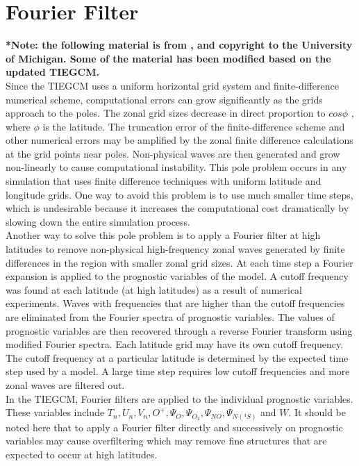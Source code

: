 \section{Fourier Filter}\label{cap:fourier}
%
\textbf{*Note: the following material is from \cite{wang1998}, 
and copyright to the University of Michigan. Some of 
the material has been modified based on the updated TIEGCM.} \\
%
Since the TIEGCM uses a uniform horizontal grid system 
and finite-difference numerical scheme, computational 
errors can grow significantly as the grids approach to 
the poles. The zonal grid sizes decrease in direct 
proportion to $cos \phi$ , where $\phi$ is the latitude. The truncation 
error of the finite-difference scheme and other numerical 
errors may be amplified by the zonal finite difference 
calculations at the grid points near poles. Non-physical 
waves are then generated and grow non-linearly to cause 
computational instability. This pole problem occurs in any 
simulation that uses finite difference techniques with uniform 
latitude and longitude grids. One way to avoid this problem is 
to use much smaller time steps, which is undesirable because it 
increases the computational cost dramatically by slowing down the 
entire simulation process. \\
%
Another way to solve this pole problem is to apply a Fourier 
filter at high latitudes to remove non-physical high-frequency 
zonal waves generated by finite differences in the region with 
smaller zonal grid sizes. At each time step a Fourier expansion 
is applied to the prognostic variables of the model. A cutoff 
frequency was found at each latitude (at high latitudes) as a 
result of numerical experiments. Waves with frequencies that are 
higher than the cutoff frequencies are eliminated from the Fourier 
spectra of prognostic variables. The values of prognostic variables 
are then recovered through a reverse Fourier transform using modified 
Fourier spectra. Each latitude grid may have its own cutoff frequency. 
The cutoff frequency at a particular latitude is determined by the 
expected time step used by a model. A large time step requires low 
cutoff frequencies and more zonal waves are filtered out.\\
% 
In the TIEGCM, Fourier filters are applied to the individual 
prognostic variables. These variables include  $T_n, U_n, V_n, O^+, 
\Psi_O, \Psi_{O_2},
\Psi_{NO}, \Psi_{N(^4S)}$  and  $W$. 
It should be noted here that to apply a Fourier filter directly and 
successively on prognostic variables may cause overfiltering which 
may remove fine structures that are expected to occur at high latitudes.

 


